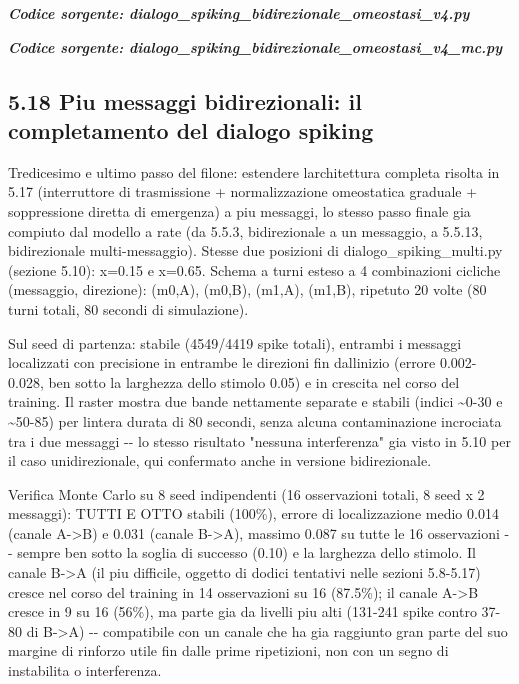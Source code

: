 \documentclass[
  italian,
]{article}
\begin{document}
\textit{\textbf{Codice sorgente: dialogo\_\allowbreak{}spiking\_\allowbreak{}bidirezionale\_\allowbreak{}omeostasi\_\allowbreak{}v4.py}}


\textit{\textbf{Codice sorgente: dialogo\_\allowbreak{}spiking\_\allowbreak{}bidirezionale\_\allowbreak{}omeostasi\_\allowbreak{}v4\_\allowbreak{}mc.py}}


\subsection{5.18 Piu\textquotesingle{} messaggi bidirezionali: il completamento del dialogo spiking}\label{piu-messaggi-bidirezionali-il-completamento-del-dialogo-spiking}

Tredicesimo e ultimo passo del filone: estendere l\textquotesingle architettura completa risolta in 5.17 (interruttore di trasmissione + normalizzazione omeostatica graduale + soppressione diretta di emergenza) a piu\textquotesingle{} messaggi, lo stesso passo finale gia\textquotesingle{} compiuto dal modello a rate (da 5.5.3, bidirezionale a un messaggio, a 5.5.13, bidirezionale multi-messaggio). Stesse due posizioni di dialogo\_\allowbreak{}spiking\_\allowbreak{}multi.py (sezione 5.10): x=0.15 e x=0.65. Schema a turni esteso a 4 combinazioni cicliche (messaggio, direzione): (m0,A), (m0,B), (m1,A), (m1,B), ripetuto 20 volte (80 turni totali, 80 secondi di simulazione).

Sul seed di partenza: stabile (4549/4419 spike totali), entrambi i messaggi localizzati con precisione in entrambe le direzioni fin dall\textquotesingle inizio (errore 0.002-0.028, ben sotto la larghezza dello stimolo 0.05) e in crescita nel corso del training. Il raster mostra due bande nettamente separate e stabili (indici \textasciitilde0-30 e \textasciitilde50-85) per l\textquotesingle intera durata di 80 secondi, senza alcuna contaminazione incrociata tra i due messaggi -\/- lo stesso risultato "nessuna interferenza" gia\textquotesingle{} visto in 5.10 per il caso unidirezionale, qui confermato anche in versione bidirezionale.

Verifica Monte Carlo su 8 seed indipendenti (16 osservazioni totali, 8 seed x 2 messaggi): TUTTI E OTTO stabili (100\%), errore di localizzazione medio 0.014 (canale A-\textgreater B) e 0.031 (canale B-\textgreater A), massimo 0.087 su tutte le 16 osservazioni -\/- sempre ben sotto la soglia di successo (0.10) e la larghezza dello stimolo. Il canale B-\textgreater A (il piu\textquotesingle{} difficile, oggetto di dodici tentativi nelle sezioni 5.8-5.17) cresce nel corso del training in 14 osservazioni su 16 (87.5\%); il canale A-\textgreater B cresce in 9 su 16 (56\%), ma parte gia\textquotesingle{} da livelli piu\textquotesingle{} alti (131-241 spike contro 37-80 di B-\textgreater A) -\/- compatibile con un canale che ha gia\textquotesingle{} raggiunto gran parte del suo margine di rinforzo utile fin dalle prime ripetizioni, non con un segno di instabilita\textquotesingle{} o interferenza.
\end{document}
